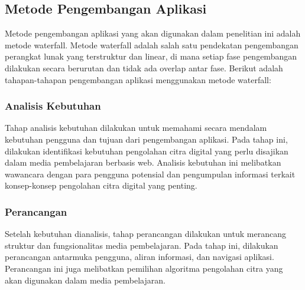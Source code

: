 \subsection{Metode Pengembangan Aplikasi}
Metode pengembangan aplikasi yang akan digunakan dalam penelitian ini adalah metode waterfall. Metode waterfall adalah salah satu pendekatan pengembangan perangkat lunak yang terstruktur dan linear, di mana setiap fase pengembangan dilakukan secara berurutan dan tidak ada overlap antar fase. Berikut adalah tahapan-tahapan pengembangan aplikasi menggunakan metode waterfall:

\subsubsection{Analisis Kebutuhan}

    Tahap analisis kebutuhan dilakukan untuk memahami secara mendalam kebutuhan pengguna dan tujuan dari pengembangan aplikasi. Pada tahap ini, dilakukan identifikasi kebutuhan pengolahan citra digital yang perlu disajikan dalam media pembelajaran berbasis web. Analisis kebutuhan ini melibatkan wawancara dengan para pengguna potensial dan pengumpulan informasi terkait konsep-konsep pengolahan citra digital yang penting.

\subsubsection{Perancangan}

    Setelah kebutuhan dianalisis, tahap perancangan dilakukan untuk merancang struktur dan fungsionalitas media pembelajaran. Pada tahap ini, dilakukan perancangan antarmuka pengguna, aliran informasi, dan navigasi aplikasi. Perancangan ini juga melibatkan pemilihan algoritma pengolahan citra yang akan digunakan dalam media pembelajaran.

